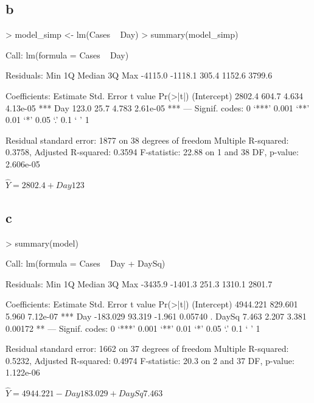 \documentclass{article}
\begin{document}
\subsection*{b}
\begin{Schunk}
\begin{Sinput}
> model_simp <- lm(Cases ~ Day)
> summary(model_simp)
\end{Sinput}
\begin{Soutput}
Call:
lm(formula = Cases ~ Day)

Residuals:
    Min      1Q  Median      3Q     Max 
-4115.0 -1118.1   305.4  1152.6  3799.6 

Coefficients:
            Estimate Std. Error t value Pr(>|t|)    
(Intercept)   2802.4      604.7   4.634 4.13e-05 ***
Day            123.0       25.7   4.783 2.61e-05 ***
---
Signif. codes:  0 ‘***’ 0.001 ‘**’ 0.01 ‘*’ 0.05 ‘.’ 0.1 ‘ ’ 1

Residual standard error: 1877 on 38 degrees of freedom
Multiple R-squared:  0.3758,	Adjusted R-squared:  0.3594 
F-statistic: 22.88 on 1 and 38 DF,  p-value: 2.606e-05
\end{Soutput}
\end{Schunk}

$\hat{Y}=2802.4+Day123$
\subsection*{c}
\begin{Schunk}
\begin{Sinput}
> summary(model)
\end{Sinput}
\begin{Soutput}
Call:
lm(formula = Cases ~ Day + DaySq)

Residuals:
    Min      1Q  Median      3Q     Max 
-3435.9 -1401.3   251.3  1310.1  2801.7 

Coefficients:
            Estimate Std. Error t value Pr(>|t|)    
(Intercept) 4944.221    829.601   5.960 7.12e-07 ***
Day         -183.029     93.319  -1.961  0.05740 .  
DaySq          7.463      2.207   3.381  0.00172 ** 
---
Signif. codes:  0 ‘***’ 0.001 ‘**’ 0.01 ‘*’ 0.05 ‘.’ 0.1 ‘ ’ 1

Residual standard error: 1662 on 37 degrees of freedom
Multiple R-squared:  0.5232,	Adjusted R-squared:  0.4974 
F-statistic:  20.3 on 2 and 37 DF,  p-value: 1.122e-06
\end{Soutput}
\end{Schunk}

$\hat{Y}=4944.221-Day183.029+DaySq7.463$
\end{document}
